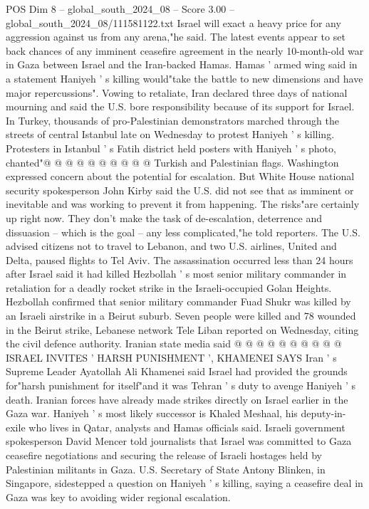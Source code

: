 \begin{textsample}{POS Dim 8 – global\_south\_2024\_08 – Score 3.00 – global\_south\_2024\_08/111581122.txt}
Israel will exact a heavy price for any aggression against us from any arena,"he said.
The latest events appear to set back chances of any imminent ceasefire agreement in the nearly 10-month-old war in Gaza between Israel and the Iran-backed Hamas.
Hamas ' armed wing said in a statement Haniyeh ' s killing would"take the battle to new dimensions and have major repercussions".
Vowing to retaliate, Iran declared three days of national mourning and said the U.S. bore responsibility because of its support for Israel.
In Turkey, thousands of pro-Palestinian demonstrators marched through the streets of central Istanbul late on Wednesday to protest Haniyeh ' s killing.
Protesters in Istanbul ' s Fatih district held posters with Haniyeh ' s photo, chanted"@ @ @ @ @ @ @ @ @ @ Turkish and Palestinian flags.
Washington expressed concern about the potential for escalation.
But White House national security spokesperson John Kirby said the U.S. did not see that as imminent or inevitable and was working to prevent it from happening.
The risks"are certainly up right now.
They don't make the task of de-escalation, deterrence and dissuasion -- which is the goal -- any less complicated,"he told reporters.
The U.S. advised citizens not to travel to Lebanon, and two U.S. airlines, United and Delta, paused flights to Tel Aviv.
The assassination occurred less than 24 hours after Israel said it had killed Hezbollah ' s most senior military commander in retaliation for a deadly rocket strike in the Israeli-occupied Golan Heights.
Hezbollah confirmed that senior military commander Fuad Shukr was killed by an Israeli airstrike in a Beirut suburb.
Seven people were killed and 78 wounded in the Beirut strike, Lebanese network Tele Liban reported on Wednesday, citing the civil defence authority.
Iranian state media said @ @ @ @ @ @ @ @ @ @ ISRAEL INVITES ' HARSH PUNISHMENT ', KHAMENEI SAYS Iran ' s Supreme Leader Ayatollah Ali Khamenei said Israel had provided the grounds for"harsh punishment for itself"and it was Tehran ' s duty to avenge Haniyeh ' s death.
Iranian forces have already made strikes directly on Israel earlier in the Gaza war.
Haniyeh ' s most likely successor is Khaled Meshaal, his deputy-in-exile who lives in Qatar, analysts and Hamas officials said.
Israeli government spokesperson David Mencer told journalists that Israel was committed to Gaza ceasefire negotiations and securing the release of Israeli hostages held by Palestinian militants in Gaza.
U.S.
Secretary of State Antony Blinken, in Singapore, sidestepped a question on Haniyeh ' s killing, saying a ceasefire deal in Gaza was key to avoiding wider regional escalation.

\end{textsample}
